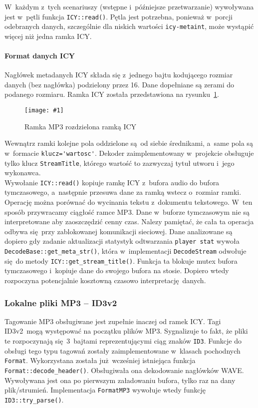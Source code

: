 \documentclass[polish]{aghengthesis}
\newcommand{\imgint}[4]{
	\begin{figure}[{#4}]
		\centering
		\texttt{[image: \#1]}
		\caption{#2}
		\label{#1}
	\end{figure}
}
\newcommand{\imgh}[3]{\imgint{#1}{#2}{#3}{H}}
\begin{document}
			W~każdym z~tych scenariuszy (wstępne i~późniejsze przetwarzanie) wywoływana jest w~pętli funkcja \lstinline|ICY::read()|. Pętla jest potrzebna, ponieważ w~porcji odebranych danych, szczególnie dla niskich wartości \lstinline|icy-metaint|, może wystąpić więcej niż jedna ramka ICY.
			
			\paragraph{Format danych ICY}
				Nagłówek metadanych ICY składa się z~jednego bajtu kodującego rozmiar danych (bez nagłówka) podzielony przez 16. Dane dopełniane są zerami do podanego rozmiaru. Ramka ICY została przedstawiona na rysunku~\ref{3/PicoRadio-icy}.
				
				\imgh{3/PicoRadio-icy}{Ramka MP3 rozdzielona ramką ICY}{0.9}
				
				\noindent
				Wewnątrz ramki kolejne pola oddzielone są od siebie średnikami, a~same pola są w~formacie \lstinline|klucz='wartosc'|. Dekoder zaimplementowany w~projekcie obsługuje tylko klucz \lstinline|StreamTitle|, którego wartość to zazwyczaj tytuł utworu i~jego wykonawca.
				$ $\\
				
			Wywołanie \lstinline|ICY::read()| kopiuje ramkę ICY z~bufora audio do bufora tymczasowego, a~następnie przesuwa dane za ramką wstecz o~rozmiar ramki. Operację można porównać do wycinania tekstu z~dokumentu tekstowego. W~ten sposób przywracamy ciągłość ramce MP3. Dane w~buforze tymczasowym nie są interpretowane aby zaoszczędzić cenny czas. Nalezy pamiętać, że cała ta operacja odbywa się przy zablokowanej komunikacji sieciowej. Dane analizowane są dopiero gdy zadanie aktualizacji statystyk odtwarzania \lstinline|player stat| wywoła \lstinline|DecodeBase::get_meta_str()|, która w~implementacji \lstinline|DecodeStream| odwołuje się do metody \lstinline|ICY::get_stream_title()|. Funkcja ta blokuje mutex bufora tymczasowego i~kopiuje dane do swojego bufora na stosie. Dopiero wtedy rozpoczyna potencjalnie kosztowną czasowo interpretację danych.
		
		\subsubsection{Lokalne pliki MP3 -- ID3v2}
			Tagowanie MP3 obsługiwane jest zupełnie inaczej od ramek ICY. Tagi ID3v2 mogą występować na początku plików MP3. Sygnalizuje to fakt, że pliki te rozpoczynają się 3~bajtami reprezentującymi ciąg znaków \lstinline|ID3|. Funkcje do obsługi tego typu tagowań zostały zaimplementowane w~klasach pochodnych \lstinline|Format|. Wykorzystana została już wcześniej istniejąca funkcja \lstinline|Format::decode_header()|. Obsługiwała ona dekodowanie nagłówków WAVE. Wywoływana jest ona po pierwszym załadowaniu bufora, tylko raz na dany plik/strumień. Implementacja \lstinline|FormatMP3| wywołuje wtedy funkcję \lstinline|ID3::try_parse()|.
			
\end{document}
